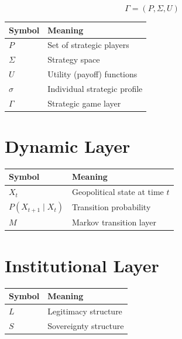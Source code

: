 \documentclass[11pt,openany]{book}
\theoremstyle{plain}
\theoremstyle{definition}
\begin{document}
\[
\Gamma=(P,\Sigma,U)
\]

\begin{center}
\begin{tabular}{ll}
\toprule
\textbf{Symbol} & \textbf{Meaning} \\
\midrule
\(P\) & Set of strategic players \\
\(\Sigma\) & Strategy space \\
\(U\) & Utility (payoff) functions \\
\(\sigma\) & Individual strategic profile \\
\(\Gamma\) & Strategic game layer \\
\bottomrule
\end{tabular}
\end{center}

\section*{Dynamic Layer}

\begin{center}
\begin{tabular}{ll}
\toprule
\textbf{Symbol} & \textbf{Meaning} \\
\midrule
\(X_t\) & Geopolitical state at time \(t\) \\
\(P(X_{t+1}\mid X_t)\) & Transition probability \\
\(M\) & Markov transition layer \\
\bottomrule
\end{tabular}
\end{center}

\section*{Institutional Layer}

\begin{center}
\begin{tabular}{ll}
\toprule
\textbf{Symbol} & \textbf{Meaning} \\
\midrule
\(L\) & Legitimacy structure \\
\(S\) & Sovereignty structure \\
\bottomrule
\end{tabular}
\end{center}
\end{document}
